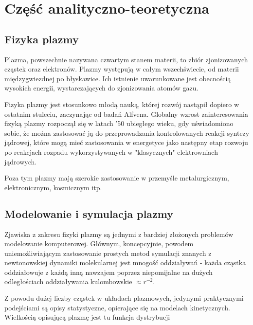 \section[Część analityczno-teoretyczna]{Część analityczno-teoretyczna} %

\subsection{Fizyka plazmy}

Plazma, powszechnie nazywana czwartym stanem materii, to zbiór zjonizowanych %
cząstek oraz elektronów. Plazmy występują w całym wszechświecie, od materii międzygwiezdnej po błyskawice.
Ich istnienie uwarunkowane jest obecnością wysokich energii, wystarczających do zjonizowania atomów gazu.

Fizyka plazmy jest stosunkowo młodą nauką, której rozwój nastąpił dopiero w ostatnim stuleciu, zaczynając od badań Alfvena. %
Globalny wzrost zainteresowania fizyką plazmy rozpoczął się w latach '50 ubiegłego wieku, %
gdy uświadomiono sobie, że można zastosować ją do przeprowadzania kontrolowanych reakcji syntezy jądrowej, %
które mogą mieć zastosowania w energetyce jako następny etap rozwoju po reakcjach rozpadu wykorzystywanych
w "klasycznych" elektrowniach jądrowych.

Poza tym plazmy mają szerokie zastosowanie w przemyśle metalurgicznym, elektronicznym, kosmicznym itp. %

\subsection{Modelowanie i symulacja plazmy}

Zjawiska z zakresu fizyki plazmy są jednymi z bardziej złożonych problemów modelowanie komputerowej.
Głównym, koncepcyjnie, powodem uniemożliwiającym zastosowanie prostych metod symulacji
znanych z newtonowskiej dynamiki molekularnej jest mnogość oddziaływań - każda cząstka oddziałowuje
z każdą inną nawzajem poprzez niepomijalne na dużych odległościach oddziaływania kulombowskie $\approx r^{-2}$.

Z powodu dużej liczby cząstek w układach plazmowych, jedynymi praktycznymi podejściami są opisy statystyczne, opierające się na
modelach kinetycznych. Wielkością opisującą plazmę jest tu funkcja dystrybucji


